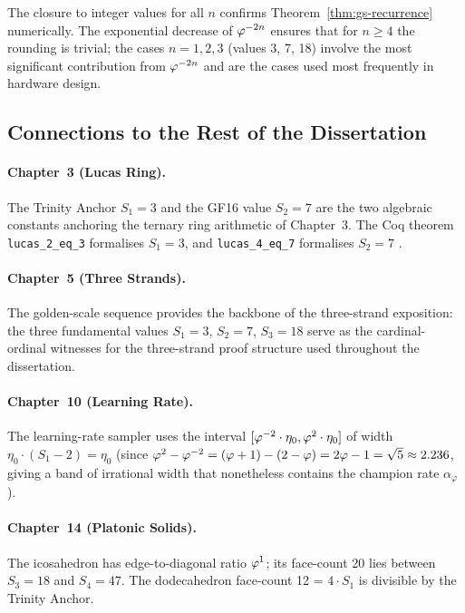 The closure to integer values for all \(n\) confirms
Theorem~\ref{thm:gs-recurrence} numerically.  The exponential
decrease of \(\varphi^{-2n}\) ensures that for \(n \ge 4\) the
rounding is trivial; the cases \(n = 1, 2, 3\) (values 3, 7, 18)
involve the most significant contribution from \(\varphi^{-2n}\) and
are the cases used most frequently in hardware design.

\subsection{Connections to the Rest of the Dissertation}
\label{subsec:gs-connections}

\paragraph{Chapter~3 (Lucas Ring).}
The Trinity Anchor \(S_1 = 3\) and the GF16 value \(S_2 = 7\) are
the two algebraic constants anchoring the ternary ring arithmetic of
Chapter~3.  The Coq theorem \texttt{lucas\_2\_eq\_3} formalises
\(S_1 = 3\), and \texttt{lucas\_4\_eq\_7} formalises \(S_2 = 7\)
\cite{koshy_fib_lucas}.

\paragraph{Chapter~5 (Three Strands).}
The golden-scale sequence provides the backbone of the three-strand
exposition: the three fundamental values \(S_1 = 3\), \(S_2 = 7\),
\(S_3 = 18\) serve as the cardinal-ordinal witnesses for the
three-strand proof structure used throughout the dissertation.

\paragraph{Chapter~10 (Learning Rate).}
The learning-rate sampler uses the interval
\([\varphi^{-2}\cdot\eta_0, \varphi^{2}\cdot\eta_0]\) of width
\(\eta_0 \cdot (S_1 - 2) = \eta_0\) (since \(\varphi^{2}-\varphi^{-2}
= (\varphi+1)-(2-\varphi) = 2\varphi-1 = \sqrt{5} \approx 2.236\),
giving a band of irrational width that nonetheless contains the
champion rate \(\alpha_\varphi\)).

\paragraph{Chapter~14 (Platonic Solids).}
The icosahedron has edge-to-diagonal ratio \(\varphi^{1}\); its
face-count 20 lies between \(S_3 = 18\) and \(S_4 = 47\).  The
dodecahedron face-count 12 = \(4 \cdot S_1\) is divisible by the
Trinity Anchor.

